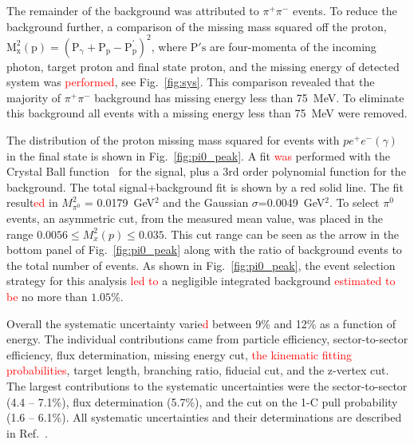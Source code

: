 \documentclass[aps,prc,twocolumn,floatfix,showpacs,preprintnumbers,amsmath,amssymb,superscriptaddress,linenumbers]{revtex4-1}
\def\pizT{$\pi^{0} \ $}
\begin{document}
The remainder of the background was attributed to $\pi^+\pi^-$
events. To reduce the background further, a comparison of the 
missing mass squared off the proton, $\mathrm{M_x^2(p) =(P_\gamma + P_p -P^{'}_p)^2}$, where $\mathrm{P's}$ are four-momenta of the incoming photon, target proton and final state proton, and the missing energy of detected system was \textcolor{red}{performed}, see Fig.~\ref{fig:sys}. This 
comparison revealed that the majority of $\pi^+\pi^-$ background 
has missing energy less than 75~MeV. To eliminate this background 
all events with a missing energy less than 75~MeV were removed.

The distribution of the proton missing mass squared for events with 
$pe^+e^-(\gamma)$ in the final state is shown in Fig.~\ref{fig:pi0_peak}. 
A fit \textcolor{red}{was} performed with the Crystal Ball function~\cite{Oreglia:1980cs,
Skwarnicki:1986xj} for the signal, plus a 3rd order polynomial function 
for the background. The total signal+background fit is shown by a red solid 
line. The fit result\textcolor{red}{ed} in $M_{\pi^0}^2$ = 0.0179~GeV$^2$ and the Gaussian 
$\sigma$=0.0049~GeV$^2$. To select \pizT events, an asymmetric cut, from 
the measured mean value, was placed in the range $0.0056 \le  M_x^2(p) 
\le 0.035$. This cut range can be seen as the arrow in the bottom 
panel of Fig.~\ref{fig:pi0_peak} along with the ratio of background 
events to the total number of events. As shown in Fig.~\ref{fig:pi0_peak}, 
the event selection strategy for this analysis \textcolor{red}{led to} a 
negligible integrated background \textcolor{red}{estimated to be} no more than $1.05\%$.

Overall the systematic uncertainty varie\textcolor{red}{d} between 9\% and 12\% as a function of energy. The individual contributions came from particle efficiency, sector-to-sector efficiency, 
flux determination, missing energy cut, \textcolor{red}{the kinematic fitting probabilities}, 
target length, branching ratio, fiducial cut, and the z-vertex cut.
The largest contributions to the systematic uncertainties 
were the sector-to-sector (4.4 -- 7.1\%), flux determination (5.7\%),
and the cut on the 1-C pull probability (1.6 -- 6.1\%). All systematic 
uncertainties and their determinations are described in Ref.~\cite{Kunkel}.

\end{document}
